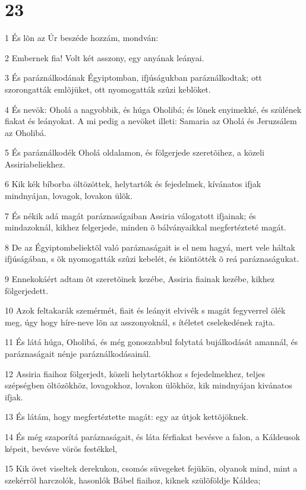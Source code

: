 \chapter{23}

\par 1 És lõn az Úr beszéde hozzám, mondván:
\par 2 Embernek fia! Volt két asszony, egy anyának leányai.
\par 3 És paráználkodának Égyiptomban, ifjúságukban paráználkodtak; ott szorongatták emlõjüket, ott nyomogatták szûzi keblöket.
\par 4 És nevök: Oholá a nagyobbik, és húga Oholibá; és lõnek enyimekké, és szülének fiakat és leányokat. A mi pedig a nevöket illeti: Samaria az Oholá és Jeruzsálem az Oholibá.
\par 5 És paráználkodék Oholá oldalamon, és fölgerjede szeretõihez, a közeli Assiriabeliekhez.
\par 6 Kik kék bíborba öltözöttek, helytartók és fejedelmek, kívánatos ifjak mindnyájan, lovagok, lovakon ülõk.
\par 7 És nékik adá magát paráznaságaiban Assiria válogatott ifjainak; és mindazoknál, kikhez felgerjede, minden õ bálványaikkal megfertézteté magát.
\par 8 De az Égyiptombeliektõl való paráznaságait is el nem hagyá, mert vele háltak ifjúságában, s õk nyomogatták szûzi kebelét, és kiöntötték õ reá paráznaságukat.
\par 9 Ennekokáért adtam õt szeretõinek kezébe, Assiria fiainak kezébe, kikhez fölgerjedett.
\par 10 Azok feltakarák szemérmét, fiait és leányit elvivék s magát fegyverrel ölék meg, úgy hogy híre-neve lõn az asszonyoknál, s ítéletet cselekedének rajta.
\par 11 És látá húga, Oholibá, és még gonoszabbul folytatá bujálkodását amannál, és paráznaságait nénje paráználkodásainál.
\par 12 Assiria fiaihoz fölgerjedt, közeli helytartókhoz s fejedelmekhez, teljes szépségben öltözõkhöz, lovagokhoz, lovakon ülõkhöz, kik mindnyájan kivánatos ifjak.
\par 13 És látám, hogy megfertéztette magát: egy az útjok kettõjöknek.
\par 14 És még szaporítá paráznaságait, és láta férfiakat bevésve a falon, a Káldeusok képeit, bevésve vörös festékkel,
\par 15 Kik övet viseltek derekukon, csomós süvegeket fejükön, olyanok mind, mint a szekérrõl harczolók, hasonlók Bábel fiaihoz, kiknek szülõföldje Káldea;
